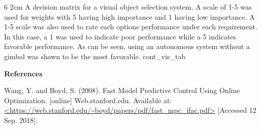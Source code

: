 \begin{AUVSITable}
{6}
{2cm}
{A decision matrix for a visual object selection system. A scale of 1-5 was used for weights with 5 having high importance and 1 having low importance. A 1-5 scale was also used to rate each options performance under each requirement. In this case, a 1 was used to indicate poor performance while a 5 indicates favorable performance. As can be seen, using an autonomous system without a gimbal was shown to be the most favorable.}
{cont_vis_tab}


\end{AUVSITable}

\textbf{References}

Wang, Y. and Boyd, S. (2008). Fast Model Predictive Control Using Online Optimization. [online] Web.stanford.edu. Available at: \url{<https://web.stanford.edu/~boyd/papers/pdf/fast_mpc_ifac.pdf>} [Accessed 12 Sep. 2018].
